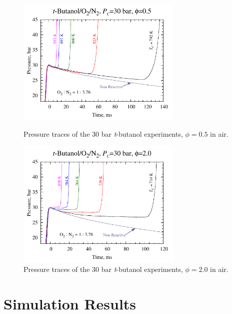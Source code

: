 \documentclass[12pt, letterpaper]{article}
\begin{document}
\begin{figure}
    \centering
    \begin{minipage}{7.9cm}
        \includegraphics[width=7.9cm]{03-Butanol/tbuoh-phi05}
        \caption{Pressure traces of the 30 bar \textit{t}-butanol experiments,
            $\phi=0.5$ in air.}
        \label{fig:tbuoh-phi05}
    \end{minipage}
    \quad
    \begin{minipage}{7.9cm}
        \includegraphics[width=7.9cm]{03-Butanol/tbuoh-phi20}
        \caption{Pressure traces of the 30 bar \textit{t}-butanol experiments,
            $\phi=2.0$ in air.}
        \label{fig:tbuoh-phi20}
    \end{minipage}
\end{figure}

\section{Simulation Results}
\label{sec:buoh-sims}
\end{document}

